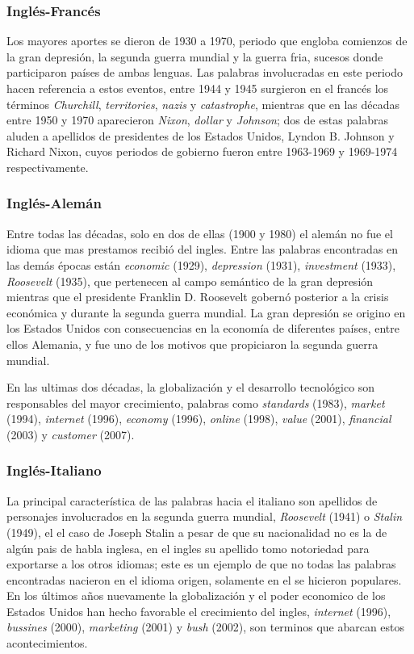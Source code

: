 \subsubsection*{Inglés-Francés} %

Los mayores aportes se dieron de 1930 a 1970, periodo que engloba comienzos de
la gran depresión, la segunda guerra mundial y la guerra fria, sucesos donde
participaron países de ambas lenguas. Las palabras involucradas en este periodo
hacen referencia a estos eventos, entre 1944 y 1945 surgieron en el francés los
términos \textit{Churchill}, \textit{territories}, \textit{nazis} y
\textit{catastrophe},  mientras que en las décadas entre 1950 y 1970
aparecieron \textit{Nixon}, \textit{dollar} y \textit{Johnson}; dos de estas
palabras aluden a apellidos de presidentes de los Estados Unidos,  Lyndon B.
Johnson y Richard Nixon, cuyos periodos de gobierno fueron  entre 1963-1969 y
1969-1974 respectivamente.
\subsubsection*{Inglés-Alemán} %
Entre todas las décadas, solo en dos de ellas (1900  y 1980) el alemán no fue
el idioma que mas prestamos recibió  del ingles. Entre las palabras encontradas
en las demás épocas están \textit{economic} (1929), \textit{depression} (1931),
\textit{investment} (1933), \textit{Roosevelt} (1935), que pertenecen al campo
semántico de la gran depresión mientras que el presidente Franklin D. Roosevelt
gobernó posterior a la crisis económica y durante la segunda guerra mundial. La
gran depresión se origino en los Estados Unidos con consecuencias en la
economía de diferentes países, entre ellos  Alemania, y fue uno de los motivos
que propiciaron la segunda guerra mundial.

En las ultimas dos décadas, la globalización y  el desarrollo tecnológico son
responsables del mayor crecimiento, palabras como \textit{standards} (1983),
\textit{market} (1994), \textit{internet} (1996), \textit{economy} (1996),
\textit{online} (1998), \textit{value} (2001), \textit{financial} (2003) y
\textit{customer} (2007). 
\subsubsection*{Inglés-Italiano} %
La principal característica de las palabras hacia el italiano son apellidos de
personajes involucrados en la segunda guerra mundial, \textit{Roosevelt} (1941)
o \textit{Stalin} (1949), el el caso de Joseph Stalin a pesar de que su
nacionalidad no es la de algún pais de habla inglesa, en el ingles su apellido
tomo notoriedad para exportarse a los otros idiomas; este es un ejemplo de que
no todas las palabras encontradas nacieron en el idioma origen,  solamente en
el se hicieron populares.  En los últimos años nuevamente la globalización y el
poder economico de los Estados Unidos han hecho favorable el crecimiento del
ingles, \textit{internet} (1996), \textit{bussines} (2000), \textit{marketing}
(2001) y \textit{bush} (2002), son terminos que abarcan estos acontecimientos. 
